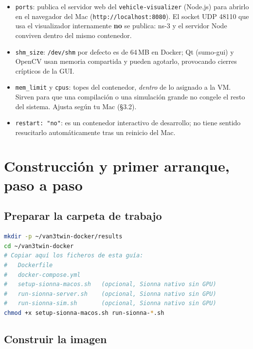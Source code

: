 \documentclass[11pt,a4paper]{article}
\begin{document}
\begin{implicacion}
\begin{itemize}
  \item \texttt{ports}: publica el servidor web del
  \texttt{vehicle-visualizer} (Node.js) para abrirlo en el navegador del Mac
  (\texttt{http://localhost:8080}). El socket UDP 48110 que usa el
  visualizador internamente \textbf{no} se publica: ns-3 y el servidor Node
  conviven dentro del mismo contenedor.
  \item \texttt{shm\_size}: \texttt{/dev/shm} por defecto es de 64\,MB en
  Docker; Qt (sumo-gui) y OpenCV usan memoria compartida y pueden agotarlo,
  provocando cierres crípticos de la GUI.
  \item \texttt{mem\_limit} y \texttt{cpus}: topes del contenedor,
  \emph{dentro} de lo asignado a la VM. Sirven para que una compilaci\'on o
  una simulaci\'on grande no congele el resto del sistema. Ajusta seg\'un tu
  Mac (\S3.2).
  \item \texttt{restart: "no"}: es un contenedor interactivo de desarrollo;
  no tiene sentido resucitarlo autom\'aticamente tras un reinicio del Mac.
\end{itemize}
\end{implicacion}

\clearpage

\section{Construcci\'on y primer arranque, paso a paso}

\subsection{Preparar la carpeta de trabajo}

\begin{lstlisting}[language=bash]
mkdir -p ~/van3twin-docker/results
cd ~/van3twin-docker
# Copiar aquí los ficheros de esta guía:
#   Dockerfile
#   docker-compose.yml
#   setup-sionna-macos.sh   (opcional, Sionna nativo sin GPU)
#   run-sionna-server.sh    (opcional, Sionna nativo sin GPU)
#   run-sionna-sim.sh       (opcional, Sionna nativo sin GPU)
chmod +x setup-sionna-macos.sh run-sionna-*.sh
\end{lstlisting}

\subsection{Construir la imagen}
\end{document}
